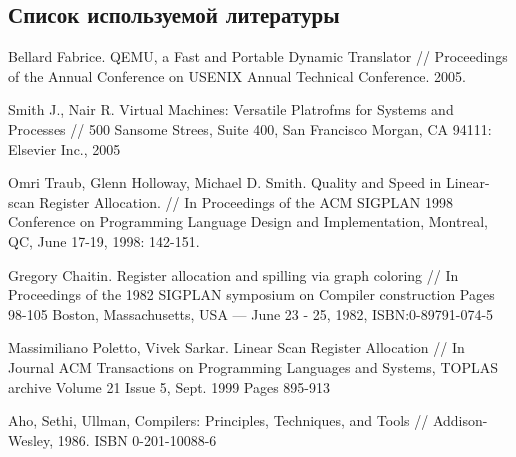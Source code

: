 \subsection{ Список используемой литературы}
\begin{my_enumerate}
\item
Bellard Fabrice. QEMU, a Fast and Portable Dynamic Translator //
Proceedings of the Annual Conference on USENIX Annual Technical Conference. 2005.

\item
Smith J., Nair R. Virtual Machines: Versatile Platrofms for Systems and Processes //
500 Sansome Strees, Suite 400, San Francisco Morgan, CA 94111: Elsevier Inc., 2005 \\

\item
Omri Traub, Glenn Holloway, Michael D. Smith. Quality and Speed in Linear-scan Register Allocation. // In Proceedings of the ACM SIGPLAN 1998 Conference on Programming Language Design and Implementation, Montreal, QC, June 17-19, 1998: 142-151. \\

\item
Gregory Chaitin. Register allocation and spilling via graph coloring // In Proceedings of the 1982 SIGPLAN symposium on Compiler construction Pages 98-105  Boston, Massachusetts, USA — June 23 - 25, 1982, ISBN:0-89791-074-5 \\

\item 	Massimiliano Poletto, Vivek Sarkar. Linear Scan Register Allocation // In Journal
ACM Transactions on Programming Languages and Systems, TOPLAS archive
Volume 21 Issue 5, Sept. 1999 Pages 895-913 \\

\item
Aho, Sethi, Ullman, Compilers: Principles, Techniques, and Tools // Addison-Wesley, 1986. ISBN 0-201-10088-6

\end{my_enumerate}


